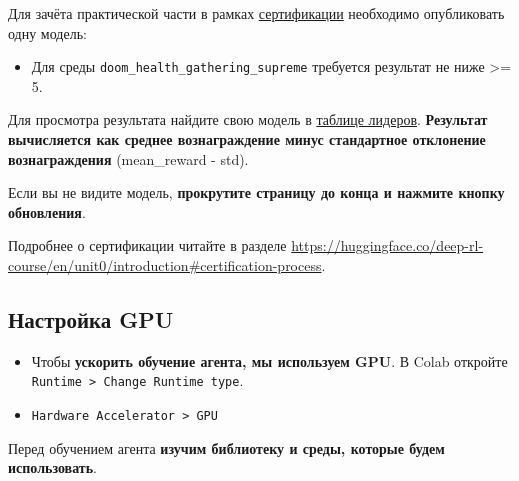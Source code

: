 \documentclass[11pt,a4paper]{article}
\begin{document}
Для зачёта практической части в рамках \href{https://huggingface.co/deep-rl-course/en/unit0/introduction\#certification-process}{сертификации} необходимо опубликовать одну модель:

\begin{itemize}
\tightlist
\item
  Для среды \texttt{doom\_health\_gathering\_supreme} требуется результат не ниже \textgreater= 5.
\end{itemize}

Для просмотра результата найдите свою модель в \href{https://huggingface.co/spaces/huggingface-projects/Deep-Reinforcement-Learning-Leaderboard}{таблице лидеров}. \textbf{Результат вычисляется как среднее вознаграждение минус стандартное отклонение вознаграждения} (mean\_reward - std).

Если вы не видите модель, \textbf{прокрутите страницу до конца и нажмите кнопку обновления}.

Подробнее о сертификации читайте в разделе \url{https://huggingface.co/deep-rl-course/en/unit0/introduction#certification-process}.

\subsection{Настройка GPU}\label{set-the-gpu-1}

\begin{itemize}
\tightlist
\item
  Чтобы \textbf{ускорить обучение агента, мы используем GPU}. В Colab откройте \texttt{Runtime\ \textgreater{}\ Change\ Runtime\ type}.
\end{itemize}


\begin{itemize}
\tightlist
\item
  \texttt{Hardware\ Accelerator\ \textgreater{}\ GPU}
\end{itemize}


Перед обучением агента \textbf{изучим библиотеку и среды, которые будем использовать}.
\end{document}

